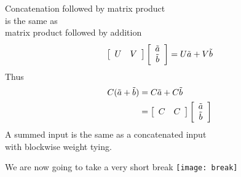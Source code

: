 \documentclass[dvipsnames]{beamer}
\newcommand{\countertitle}[1]{\vfill\vfill{\centering \Large \color{bluewrite} #1}\vspace{-0.5cm}}
\begin{document}
\begin{frame}{Concatenation followed by matrix product\\ is the same as \\matrix product followed by addition}
	\vspace{-0.7cm}
	\begin{equation*}
	\left[\begin{array}{cc}
	U & V\end{array}\right]\left[\begin{array}{c}
	\tilde{a}\\
	\tilde{b}
	\end{array}\right] = U\tilde{a} + V \tilde{b}
	\end{equation*}
	Thus
	\begin{align*}
	C (\tilde{a} + \tilde{b}) &= 
	C\tilde{a} + C \tilde{b} \\&=
	\left[\begin{array}{cc}
	C & C\end{array}\right]\left[\begin{array}{c}
	\tilde{a}\\
	\tilde{b}
	\end{array}\right]
	\end{align*}
	\countertitle{A summed input is the same as a concatenated input\\ with blockwise weight tying.}
	\vfill
	\vfill
	\vfill
	\vfill
	\vfill
\end{frame}

\begin{frame}{We are now going to take a very short break}
	\centering
	\texttt{[image: break]}	
\end{frame}
\end{document}

